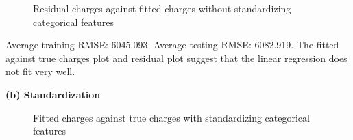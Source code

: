\documentclass{article}
\begin{document}
\begin{figure}[!htbp]
\centering
{}
\caption{Residual charges against fitted charges without standardizing categorical features} \label{3_1_a_2}
\end{figure}

Average training RMSE: 6045.093.\newline
\indent Average testing RMSE: 6082.919.\newline
\indent The fitted against true charges plot and residual plot suggest that the linear regression does not fit  very well.\bigbreak

\noindent \textbf{(b) Standardization} \bigbreak

\begin{figure}[!htbp]
\centering
{}
\caption{Fitted charges against true charges with standardizing categorical features} \label{3_1_b_1}
\end{figure}
\end{document}
